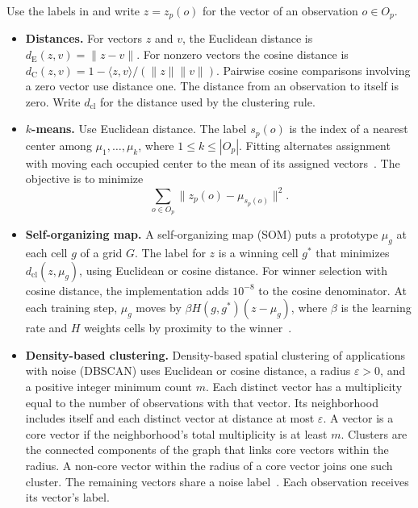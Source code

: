 \begin{Definition}\label{def:clustering-rules}
Use the labels in  and write $z=z_p(o)$ for the vector of an observation $o\in O_p$.
\begin{itemize}
  \item \textbf{Distances.} For vectors $z$ and $v$, the Euclidean distance is $d_{\mathrm E}(z,v)=\|z-v\|$. For nonzero vectors the cosine distance is $d_{\mathrm C}(z,v)=1-\langle z,v\rangle/(\|z\|\|v\|)$. Pairwise cosine comparisons involving a zero vector use distance one. The distance from an observation to itself is zero. Write $d_{\mathrm{cl}}$ for the distance used by the clustering rule.
  \item \textbf{$k$-means.} Use Euclidean distance. The label $s_p(o)$ is the index of a nearest center among $\mu_1,\ldots,\mu_k$, where $1\leq k\leq|O_p|$. Fitting alternates assignment with moving each occupied center to the mean of its assigned vectors~\cite{lloyd1982quantization}. The objective is to minimize
  \[
      \sum_{o\in O_p}\|z_p(o)-\mu_{s_p(o)}\|^2 .
  \]
  \item \textbf{Self-organizing map.} A self-organizing map (SOM) puts a prototype $\mu_g$ at each cell $g$ of a grid $G$. The label for $z$ is a winning cell $g^\ast$ that minimizes $d_{\mathrm{cl}}(z,\mu_g)$, using Euclidean or cosine distance. For winner selection with cosine distance, the implementation adds $10^{-8}$ to the cosine denominator. At each training step, $\mu_g$ moves by $\beta H(g,g^\ast)(z-\mu_g)$, where $\beta$ is the learning rate and $H$ weights cells by proximity to the winner~\cite{kohonen1982maps}.
  \item \textbf{Density-based clustering.} Density-based spatial clustering of applications with noise (DBSCAN) uses Euclidean or cosine distance, a radius $\varepsilon>0$, and a positive integer minimum count $m$. Each distinct vector has a multiplicity equal to the number of observations with that vector. Its neighborhood includes itself and each distinct vector at distance at most $\varepsilon$. A vector is a core vector if the neighborhood's total multiplicity is at least $m$. Clusters are the connected components of the graph that links core vectors within the radius. A non-core vector within the radius of a core vector joins one such cluster. The remaining vectors share a noise label~\cite{ester1996density}. Each observation receives its vector's label.
\end{itemize}
\end{Definition}

